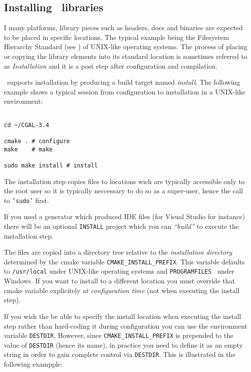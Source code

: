 \subsection{Installing \cgal\ libraries}

I many platforms, library pieces such as headers, docs and binaries are expected to be placed in specific locations. The
typical example being the Filesystem Hierarchy Standard (see \fhs) of UNIX-like operating systems. The process of placing or copying
the library elements into its standard location is sometimes referred to as {\em Installation} and it is a post step after
configuration and compilation.

\cmake\ supports installation by producing a build target named {\em install}. The following example shows a typical session
from configuration to installation in a UNIX-like environment:

{\ccTexHtml{\scriptsize}{}
\begin{verbatim}

cd ~/CGAL-3.4

cmake . # configure
make    # make

sudo make install # install

\end{verbatim}
}

The installation step copies files to locations wich are typically accessible only to the root user so
it is typically neccessary to do so as a super-user, hence the call to {\tt 'sudo'} first.

If you used a generator which produced IDE files (for Visual Studio for instance) there will be an optional
{\tt INSTALL} project which you can {\em ``build''} to execute the installation step. 

The files are copied into a directory tree relative to the {\em installation directory} determined by the 
cmake variable {\tt CMAKE\_INSTALL\_PREFIX}. This variable defaults to {\tt /usr/local} under UNIX-like operating systems
and {\tt PROGRAMFILES } under Windows. If you want to install to a different location you must override that cmake
variable explicitely {\em at configuration time} (not when executing the install step).

If you wish the be able to specify the install location when executing the install step rather than hard-coding it during
configuration you can use the environment variable {\tt DESTDIR}. However, since {\tt CMAKE\_INSTALL\_PREFIX} is prepended
to the value of {\tt DESTDIR} (hence its name), in practice you need to define it as an empty string in order to gain complete
control via {\tt DESTDIR}.
This is illustrated in the following exampple:

